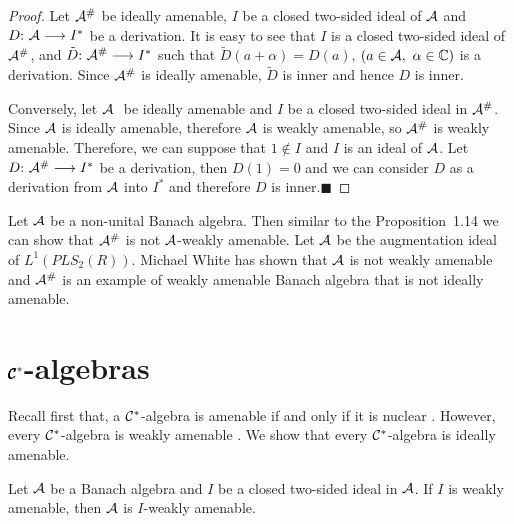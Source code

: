 \documentclass[fleqn]{mat01}
\begin{document}
\begin{proof}
Let ${\cal A}^{\#}$ be ideally amenable, $I$ be a closed two-sided ideal
of ${\cal A}$ and $D\hbox{:}\ {\cal A} \longrightarrow I^*$ be a
derivation. It is easy to see that $I$ is a closed two-sided ideal of
${\cal A} ^{\#}$, and ${\tilde D}\hbox{:}\ {\cal A}^{\#} \longrightarrow
I^*$ such that $ {\tilde D} (a+\alpha) = D(a)$, $ (a \in {\cal A} ,~
\alpha \in \Bbb C )$ is a derivation. Since ${\cal A}^{\#}$ is ideally
amenable, $ \tilde{D} $ is inner and hence $D$ is inner.

Conversely, let ${\cal A}\ $ be ideally amenable and $I$ be a closed
two-sided ideal in ${\cal A}^{\#}$. Since ${\cal A}$ is ideally
amenable, therefore ${\cal A}$ is weakly amenable, so ${\cal A}^{\#}$ is
weakly amenable. Therefore, we can suppose that $1 \notin I$ and $I$ is
an ideal of ${\cal A}$. Let $D\hbox{:}\ {\cal A}^{\#} \longrightarrow
I^*$ be a derivation, then $ D(1)=0$ and we can consider $D$ as a
derivation from ${\cal A}$ into $I^*$ and therefore $D$ is\break
inner.\hfill $\blacksquare$
\end{proof}

Let $\cal A$ be a non-unital Banach algebra. Then similar to the
Proposition~1.14 we can show that ${\cal A}^{\#}$ is not $\cal A$-weakly
amenable. Let $\cal A$ be the augmentation ideal of $L^1(PLS_2(R))$.
Michael White has shown that $\cal A$ is not weakly amenable and ${\cal
A}^{\#}$ is an example of weakly amenable Banach algebra that is not
ideally amenable.

\section{${\pmb{\cal C}}^*$-algebras}

Recall first that, a ${\cal C}^*$-algebra is amenable if and only if it
is nuclear \cite{Ha}. However, every ${\cal C}^*$-algebra is weakly
amenable \cite{Ha}. We show that every ${\cal C}^*$-algebra is ideally\break
amenable.

\setcounter{theo}{0}
\begin{lem}
Let ${\cal A}$ be a Banach algebra and $I$ be a closed two-sided ideal
in ${\cal A}$. If $I$ is weakly amenable{\rm ,} then ${\cal A}$ is
$I$-weakly amenable.
\end{lem}
\end{document}
